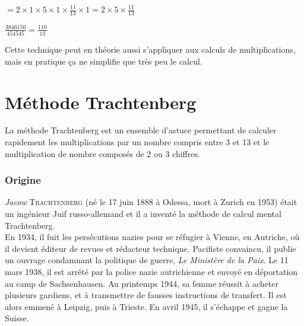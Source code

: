 \documentclass[a4paper]{article}
\begin{document}
\vspace{4 mm}

{\Large {} $= 2 \times 1 \times 5 \times 1 \times \frac{11}{13} \times 1 = 2 \times 5 \times \frac{11}{13}$}

\vspace{6 mm}

{\Large $ \frac{3846150}{454545} = \frac{110}{13}$}

\vspace{1.5 cm}

Cette technique peut en théorie aussi s'appliquer aux calculs de multiplications, mais en pratique ça ne simplifie que très peu le calcul.

\pagebreak






\section{Méthode Trachtenberg}


\vfill


La méthode Trachtenberg est un ensemble d'astuce permettant de calculer rapidement les multiplications par un nombre compris entre 3 et 13 et le multiplication de nombre composés de 2 ou 3 chiffres.


\vfill


\subsubsection*{Origine}

\textit{Jacow} {\scshape Trachtenberg} (né le 17 juin 1888 à Odessa, mort à Zurich en 1953) était un ingénieur Juif russo-allemand et il a inventé la méthode de calcul mental Trachtenberg.\\

En 1934, il fuit les persécutions nazies pour se réfugier à Vienne, en Autriche, où il devient éditeur de revues et rédacteur technique. Pacifiste convaincu, il publie un ouvrage condamnant la politique de guerre, \textit{Le Ministère de la Paix}. Le 11 mars 1938, il est arrêté par la police nazie autrichienne et envoyé en déportation au camp de Sachsenhausen. Au printemps 1944, sa femme réussit à acheter plusieurs gardiens, et à transmettre de fausses instructions de transfert. Il est alors emmené à Leipzig, puis à Trieste. En avril 1945, il s'échappe et gagne la Suisse.\\
\end{document}
